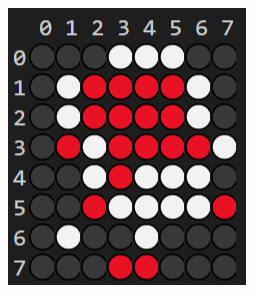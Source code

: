 \documentclass{beamer}
\begin{document}
{\begin{example}
\begin{columns}
\begin{column}{0.5\textwidth}
            \includegraphics[width=\linewidth]{handbook/gomoku.png}
        \end{column}
    \end{columns}

\end{example}
}
\end{document}
